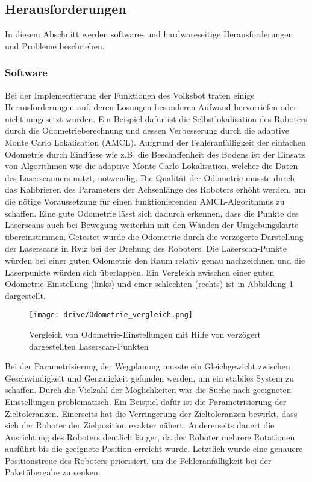 \subsection{Herausforderungen}

In diesem Abschnitt werden software- und hardwareseitige Herausforderungen und Probleme beschrieben.

\subsubsection{Software}

Bei der Implementierung der Funktionen des Volksbot traten einige Herausforderungen auf, deren Lösungen besonderen Aufwand hervorriefen oder nicht umgesetzt wurden. Ein Beispiel dafür ist die Selbstlokalisation des Roboters durch die Odometrieberechnung und dessen Verbesserung durch die adaptive Monte Carlo Lokalisation (AMCL). Aufgrund der Fehleranfälligkeit der einfachen Odometrie durch Einflüsse wie z.B. die Beschaffenheit des Bodens ist der Einsatz von Algorithmen wie die adaptive Monte Carlo Lokalisation, welcher die Daten des Laserscanners nutzt, notwendig.  Die Qualität der Odometrie musste durch das Kalibrieren des Parameters der Achsenlänge des Roboters erhöht werden, um die nötige Voraussetzung für einen funktionierenden AMCL-Algorithmus zu schaffen. Eine gute Odometrie lässt sich dadurch erkennen, dass die Punkte des Laserscans auch bei Bewegung weiterhin mit den Wänden der Umgebungskarte übereinstimmen. Getestet wurde die Odometrie durch die verzögerte Darstellung der Laserscans in Rviz bei der Drehung des Roboters. Die Laserscan-Punkte würden bei einer guten Odometrie den Raum relativ genau nachzeichnen und die Laserpunkte würden sich überlappen. Ein Vergleich zwischen einer guten Odometrie-Einstellung (links) und einer schlechten (rechts) ist in Abbildung \ref{fig:Odo_vergleich} dargestellt.

\begin{figure}[h!]
 \centering
		\texttt{[image: drive/Odometrie\_vergleich.png]}
	\caption{Vergleich von Odometrie-Einstellungen mit Hilfe von verzögert dargestellten Laserscan-Punkten}
	\label{fig:Odo_vergleich}
\end{figure}

Bei der Parametrisierung der Wegplanung musste ein Gleichgewicht zwischen Geschwindigkeit und Genauigkeit gefunden werden, um ein stabiles System zu schaffen. Durch die Vielzahl der Möglichkeiten war die Suche nach geeigneten Einstellungen problematisch. Ein Beispiel dafür ist die Parametrisierung der Zieltoleranzen. Einerseits hat die Verringerung der Zieltoleranzen bewirkt, dass sich der Roboter der Zielposition exakter nähert. Andererseits dauert die Ausrichtung des Roboters deutlich länger, da der Roboter mehrere Rotationen ausführt bis die geeignete Position erreicht wurde. Letztlich wurde eine genauere Positionstreue des Roboters priorisiert, um die Fehleranfälligkeit bei der Paketübergabe zu senken.

